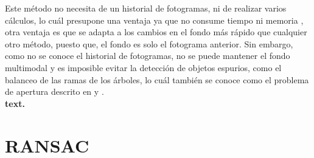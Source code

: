 Este método no necesita de un historial de fotogramas, ni de realizar varios cálculos, lo cuál presupone una ventaja ya que no consume tiempo ni memoria \cite{InsafSlimane}, otra ventaja es que se adapta a los cambios en el fondo más rápido que cualquier otro método, puesto que, el fondo es solo el fotograma anterior. Sin embargo, como no se conoce el historial de fotogramas, no se puede mantener el fondo multimodal y es imposible evitar la detección de objetos espurios, como el balanceo de las ramas de los árboles, lo cuál también se conoce como el problema de apertura descrito en \cite{ApewokinApewokinWillsWillsGentile} y \cite{KentaroJohnBarryBrian}.\\

\textbf{text.}

\section{RANSAC}
